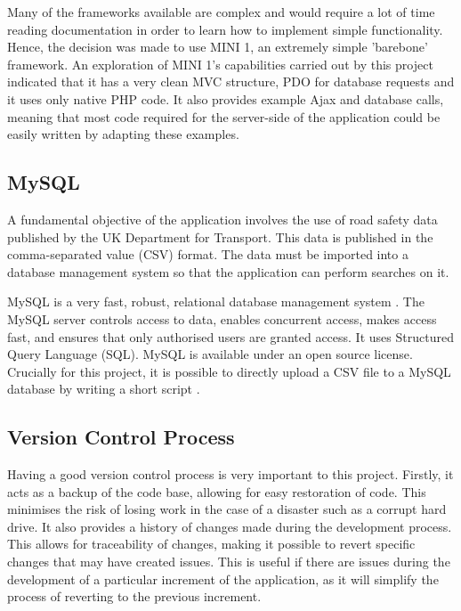 \documentclass[authoryearcitations]{UoYCSproject}
\begin{document}
Many of the frameworks available are complex and would require a lot of time reading documentation in order to learn how to implement simple functionality. Hence, the decision was made to use MINI 1\citep{mini}, an extremely simple 'barebone' framework. An exploration of MINI 1's capabilities carried out by this project indicated that it has a very clean MVC structure, PDO for database requests and it uses only native PHP code. It also provides example Ajax and database calls, meaning that most code required for the server-side of the application could be easily written by adapting these examples.

\subsection{MySQL}

A fundamental objective of the application involves the use of road safety data published by the UK Department for Transport. This data is published in the comma-separated value (CSV) format. The data must be imported into a database management system so that the application can perform searches on it.

MySQL is a very fast, robust, relational database management system \citep{Welling2005}. The MySQL server controls access to data, enables concurrent access, makes access fast, and ensures that only authorised users are granted access. It uses Structured Query Language (SQL). MySQL is available under an open source license. Crucially for this project, it is possible to directly upload a CSV file to a MySQL database by writing a short script \citep{MySQLTutorial}.

\subsection{Version Control Process}

Having a good version control process is very important to this project. Firstly, it acts as a backup of the code base, allowing for easy restoration of code. This minimises the risk of losing work in the case of a disaster such as a corrupt hard drive. It also provides a history of changes made during the development process. This allows for traceability of changes, making it possible to revert specific changes that may have created issues. This is useful if there are issues during the development of a particular increment of the application, as it will simplify the process of reverting to the previous increment.
\end{document}
